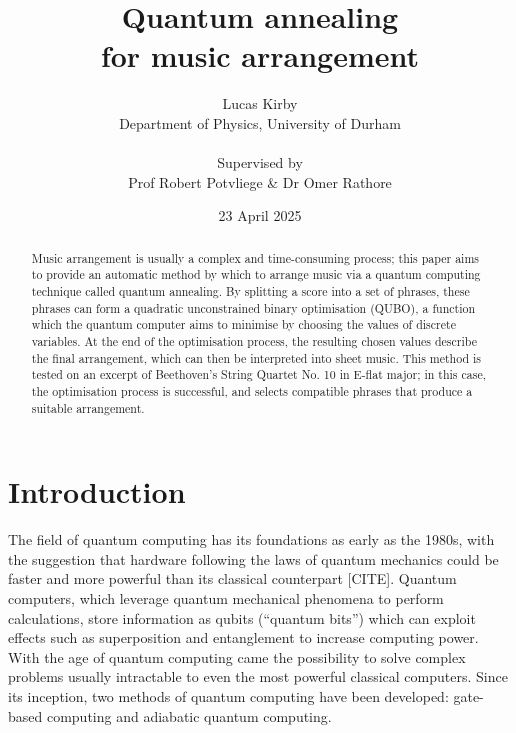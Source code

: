 \documentclass[12pt]{article}
\title{\Huge \bfseries Quantum annealing\\for music arrangement}
\author{Lucas Kirby\\\normalsize Department of Physics, University of Durham\\\\\normalsize Supervised by\\\normalsize Prof Robert Potvliege \& Dr Omer Rathore}
\date{\normalsize 23 April 2025}
\theoremstyle{definition}
\begin{document}
\maketitle

\vfill

\begin{abstract}              

Music arrangement is usually a complex and time-consuming process; this paper aims to provide an automatic method by which to arrange music via a quantum computing technique called quantum annealing. By splitting a score into a set of phrases, these phrases can form a quadratic unconstrained binary optimisation (QUBO), a function which the quantum computer aims to minimise by choosing the values of discrete variables. At the end of the optimisation process, the resulting chosen values describe the final arrangement, which can then be interpreted into sheet music. This method is tested on an excerpt of Beethoven's String Quartet No. 10 in E-flat major; in this case, the optimisation process is successful, and selects compatible phrases that produce a suitable arrangement.

\end{abstract}

\vfill

\begin{center}
    
\end{center}

\thispagestyle{empty}
\clearpage

\tableofcontents

\thispagestyle{empty}
\clearpage

\section{Introduction}

The field of quantum computing has its foundations as early as the 1980s, with the suggestion that hardware following the laws of quantum mechanics could be faster and more powerful than its classical counterpart [CITE].
Quantum computers, which leverage quantum mechanical phenomena to perform calculations, store information as qubits (``quantum bits'') which can exploit effects such as superposition and entanglement to increase computing power.
With the age of quantum computing came the possibility to solve complex problems usually intractable to even the most powerful classical computers. 
Since its inception, two methods of quantum computing have been developed: gate-based computing and adiabatic quantum computing.
\end{document}
